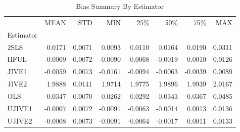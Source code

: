 \begin{table}[ht]
\centering
\caption{Bias Summary By Estimator}
\begin{tabular}{lrrrrrrr}
\toprule
 & MEAN & STD & MIN & 25\% & 50\% & 75\% & MAX \\
Estimator &  &  &  &  &  &  &  \\
\midrule
2SLS & 0.0171 & 0.0071 & 0.0093 & 0.0110 & 0.0164 & 0.0190 & 0.0311 \\
HFUL & -0.0009 & 0.0072 & -0.0090 & -0.0068 & -0.0019 & 0.0010 & 0.0126 \\
JIVE1 & -0.0059 & 0.0073 & -0.0161 & -0.0094 & -0.0063 & -0.0039 & 0.0089 \\
JIVE2 & 1.9888 & 0.0141 & 1.9714 & 1.9775 & 1.9896 & 1.9939 & 2.0167 \\
OLS & 0.0347 & 0.0070 & 0.0262 & 0.0292 & 0.0343 & 0.0367 & 0.0485 \\
UJIVE1 & -0.0007 & 0.0072 & -0.0091 & -0.0063 & -0.0014 & 0.0013 & 0.0136 \\
UJIVE2 & -0.0008 & 0.0073 & -0.0091 & -0.0064 & -0.0017 & 0.0011 & 0.0133 \\
\bottomrule
\end{tabular}
\end{table}
